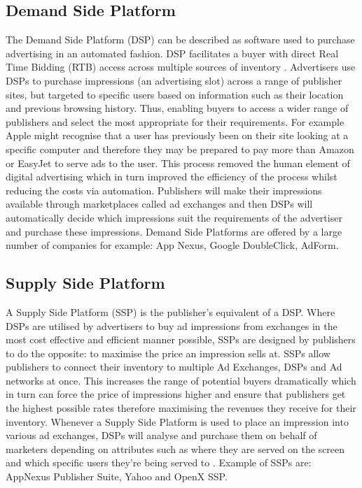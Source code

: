\documentclass{article}
\begin{document}
\subsection{Demand Side Platform} \label{DSP}
The Demand Side Platform (DSP) can be described as software used to purchase advertising in an automated fashion. DSP facilitates a buyer with direct Real Time Bidding (RTB) access across multiple sources of inventory \parencite{introDSP}. Advertisers use DSPs to purchase impressions (an advertising slot) across a range of publisher sites, but targeted to specific users based on information such as their location and previous browsing history. Thus, enabling buyers to access a wider range of publishers and select the most appropriate for their requirements. For example Apple might recognise that a user has previously been on their site looking at a specific computer and therefore they may be prepared to pay more than Amazon or EasyJet to serve ads to the user. This process removed the human element of digital advertising which in turn improved the efficiency of the process whilst reducing the costs via automation. Publishers will make their impressions available through marketplaces called ad exchanges and then DSPs will automatically decide which impressions suit the requirements of the advertiser and purchase these impressions. Demand Side Platforms are offered by a large number of companies for example: App Nexus, Google DoubleClick, AdForm. 

\subsection{Supply Side Platform} \label{SSP}
A Supply Side Platform (SSP) is the publisher's equivalent of a DSP. Where DSPs are utilised by advertisers to buy ad impressions from exchanges in the most cost effective and efficient manner possible, SSPs are designed by publishers to do the opposite: to maximise the price an impression sells at. SSPs allow publishers to connect their inventory to multiple Ad Exchanges, DSPs and Ad networks at once. This increases the range of potential buyers dramatically which in turn can force the price of impressions higher and ensure that publishers get the highest possible rates therefore maximising the revenues they receive for their inventory. Whenever a Supply Side Platform is used to place an impression into various ad exchanges, DSPs will analyse and purchase them on behalf of marketers depending on attributes such as where they are served on the screen and which specific users they're being served to \parencite{introDSP}. Example of SSPs are: AppNexus Publisher Suite, Yahoo and OpenX SSP.  
\end{document}
